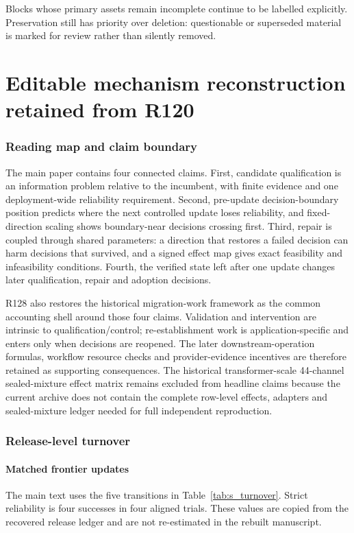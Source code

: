 \documentclass[11pt,letterpaper]{article}
\theoremstyle{plain}
\newcommand{\1}{\mathbf 1}
\begin{document}
Blocks whose primary assets remain incomplete continue to be labelled explicitly. Preservation still has priority over deletion: questionable or superseded material is marked for review rather than silently removed.

\clearpage
\part{Editable mechanism reconstruction retained from R120}
\section{Reading map and claim boundary}
The main paper contains four connected claims. First, candidate qualification is an information problem relative to the incumbent, with finite evidence and one deployment-wide reliability requirement. Second, pre-update decision-boundary position predicts where the next controlled update loses reliability, and fixed-direction scaling shows boundary-near decisions crossing first. Third, repair is coupled through shared parameters: a direction that restores a failed decision can harm decisions that survived, and a signed effect map gives exact feasibility and infeasibility conditions. Fourth, the verified state left after one update changes later qualification, repair and adoption decisions.

R128 also restores the historical migration-work framework as the common accounting shell around those four claims. Validation and intervention are intrinsic to qualification/control; re-establishment work is application-specific and enters only when decisions are reopened. The later downstream-operation formulas, workflow resource checks and provider-evidence incentives are therefore retained as supporting consequences. The historical transformer-scale 44-channel sealed-mixture effect matrix remains excluded from headline claims because the current archive does not contain the complete row-level effects, adapters and sealed-mixture ledger needed for full independent reproduction.

\section{Release-level turnover}
\subsection{Matched frontier updates}
The main text uses the five transitions in Table~\ref{tab:s_turnover}. Strict reliability is four successes in four aligned trials. These values are copied from the recovered release ledger and are not re-estimated in the rebuilt manuscript.
\end{document}
